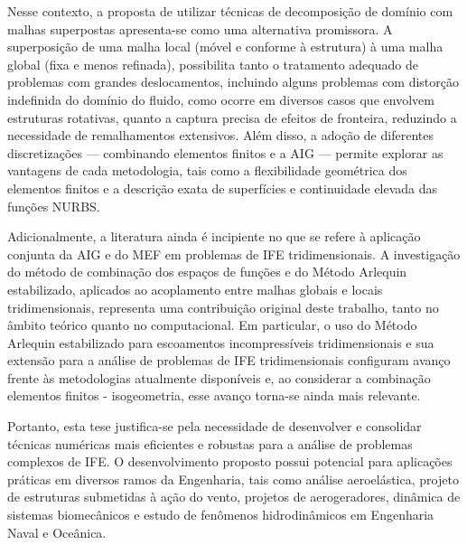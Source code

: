Nesse contexto, a proposta de utilizar técnicas de decomposição de domínio com malhas superpostas apresenta-se como uma alternativa promissora. A superposição de uma malha local (móvel e conforme à estrutura) à uma malha global (fixa e menos refinada), possibilita tanto o tratamento adequado de problemas com grandes deslocamentos, incluindo alguns problemas com distorção indefinida do domínio do fluido, como ocorre em diversos casos que envolvem estruturas rotativas, quanto a captura precisa de efeitos de fronteira, reduzindo a necessidade de remalhamentos extensivos. Além disso, a adoção de diferentes discretizações — combinando elementos finitos e a AIG — permite explorar as vantagens de cada metodologia, tais como a flexibilidade geométrica dos elementos finitos e a descrição exata de superfícies e continuidade elevada das funções NURBS.

Adicionalmente, a literatura ainda é incipiente no que se refere à aplicação conjunta da AIG e do MEF em problemas de IFE tridimensionais. A investigação do método de combinação dos espaços de funções e do Método Arlequin estabilizado, aplicados ao acoplamento entre malhas globais e locais tridimensionais, representa uma contribuição original deste trabalho, tanto no âmbito teórico quanto no computacional. Em particular, o uso do Método Arlequin estabilizado para escoamentos incompressíveis tridimensionais e sua extensão para a análise de problemas de IFE tridimensionais configuram avanço frente às metodologias atualmente disponíveis e, ao considerar a combinação elementos finitos - isogeometria, esse avanço torna-se ainda mais relevante.

Portanto, esta tese justifica-se pela necessidade de desenvolver e consolidar técnicas numéricas mais eficientes e robustas para a análise de problemas complexos de IFE. O desenvolvimento proposto possui potencial para aplicações práticas em diversos ramos da Engenharia, tais como análise aeroelástica, projeto de estruturas submetidas à ação do vento, projetos de aerogeradores, dinâmica de sistemas biomecânicos e estudo de fenômenos hidrodinâmicos em Engenharia Naval e Oceânica.

